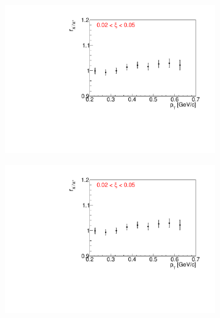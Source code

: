 \begin{figure}[h!]
	\centering
	\begin{subfigure}{.32\textwidth}
		\includegraphics[width=\linewidth, page=3]{chapters/chrgSTAR/img/dEdx/fit2019_fitResult_0_0_step_0.pdf}
	\end{subfigure}
	\begin{subfigure}{.32\textwidth}
		\includegraphics[width=\linewidth, page=4]{chapters/chrgSTAR/img/dEdx/fit2019_fitResult_0_0_step_0.pdf}
	\end{subfigure}
	\begin{subfigure}{.32\textwidth}

\end{subfigure}
\end{figure}
